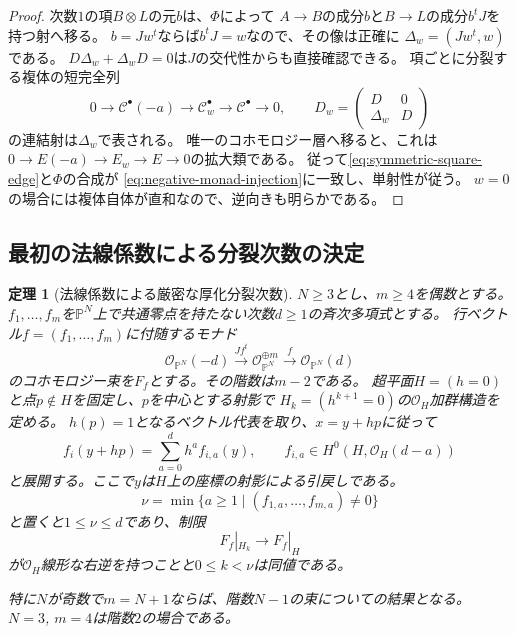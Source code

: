 \documentclass[a4paper,11pt]{ltjsarticle}
\numberwithin{equation}{section}
\theoremstyle{plain}
\newtheorem{theorem}{定理}[section]
\theoremstyle{definition}
\theoremstyle{remark}
\begin{document}
\begin{proof}
次数$1$の項$B\otimes L$の元$b$は、$\Phi$によって
$A\to B$の成分$b$と$B\to L$の成分$b^tJ$を持つ射へ移る。
$b=Jw^t$ならば$b^tJ=w$なので、その像は正確に
$\Delta_w=(Jw^t,w)$である。
$D\Delta_w+\Delta_wD=0$は$J$の交代性からも直接確認できる。
項ごとに分裂する複体の短完全列
\[
 0\longrightarrow\mathcal C^\bullet(-a)
 \longrightarrow\mathcal C^\bullet_w
 \longrightarrow\mathcal C^\bullet\longrightarrow0,
 \qquad
 D_w=\begin{pmatrix}D&0\\ \Delta_w&D\end{pmatrix}
\]
の連結射は$\Delta_w$で表される。
唯一のコホモロジー層へ移ると、これは
$0\to E(-a)\to E_w\to E\to0$の拡大類である。
従って\eqref{eq:symmetric-square-edge}と$\Phi$の合成が
\eqref{eq:negative-monad-injection}に一致し、単射性が従う。
$w=0$の場合には複体自体が直和なので、逆向きも明らかである。
\end{proof}

\subsection{最初の法線係数による分裂次数の決定}

\begin{theorem}[法線係数による厳密な厚化分裂次数]
\label{thm:normal-coefficient-depth}
$N\geq3$とし、$m\geq4$を偶数とする。
$f_1,\ldots,f_m$を$\mathbb P^N$上で共通零点を持たない次数$d\geq1$の斉次多項式とする。
行ベクトル$f=(f_1,\ldots,f_m)$に付随するモナド
\[
 \mathcal O_{\mathbb P^N}(-d)
 \xrightarrow{Jf^t}
 \mathcal O_{\mathbb P^N}^{\oplus m}
 \xrightarrow{f}
 \mathcal O_{\mathbb P^N}(d)
\]
のコホモロジー束を$F_f$とする。その階数は$m-2$である。
超平面$H=(h=0)$と点$p\notin H$を固定し、$p$を中心とする射影で
$H_k=(h^{k+1}=0)$の$\mathcal O_H$加群構造を定める。
$h(p)=1$となるベクトル代表を取り、$x=y+hp$に従って
\begin{equation}
\label{eq:normal-polynomial-expansion}
 f_i(y+hp)=\sum_{a=0}^d h^a f_{i,a}(y),
 \qquad f_{i,a}\in H^0(H,\mathcal O_H(d-a))
\end{equation}
と展開する。ここで$y$は$H$上の座標の射影による引戻しである。
\[
 \nu=\min\{a\geq1\mid(f_{1,a},\ldots,f_{m,a})\ne0\}
\]
と置くと$1\leq\nu\leq d$であり、制限
\begin{equation}
\label{eq:normal-depth-quotient}
 F_f|_{H_k}\longrightarrow F_f|_H
\end{equation}
が$\mathcal O_H$線形な右逆を持つことと$0\leq k<\nu$は同値である。

特に$N$が奇数で$m=N+1$ならば、階数$N-1$の束についての結果となる。
$N=3$, $m=4$は階数$2$の場合である。
\end{theorem}
\end{document}
